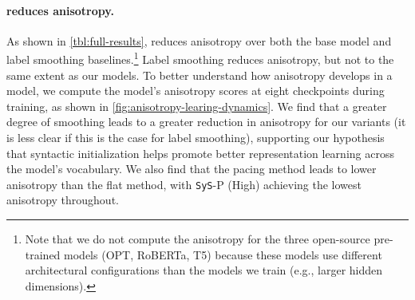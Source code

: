 \paragraph{\smoothing reduces anisotropy.}

As shown in \cref{tbl:full-results}, \newline \smoothing reduces anisotropy over both the base model and label smoothing baselines.\footnote{Note that we do not compute the anisotropy for the three open-source pre-trained models (OPT, RoBERTa, T5) because these models use different architectural configurations than the models we train (e.g., larger hidden dimensions).} Label smoothing reduces anisotropy, but not to the same extent as our \smoothing models. To better understand how anisotropy develops in a model, we compute the model's anisotropy scores at eight checkpoints during training, as shown in \cref{fig:anisotropy-learing-dynamics}. We find that a greater degree of smoothing leads to a greater reduction in anisotropy for our \smoothing variants (it is less clear if this is the case for label smoothing), supporting our hypothesis that syntactic initialization helps promote better representation learning across the model's vocabulary. We also find that the pacing method leads to lower anisotropy than the flat method, with \texttt{SyS}-P (High) achieving the lowest anisotropy throughout.

